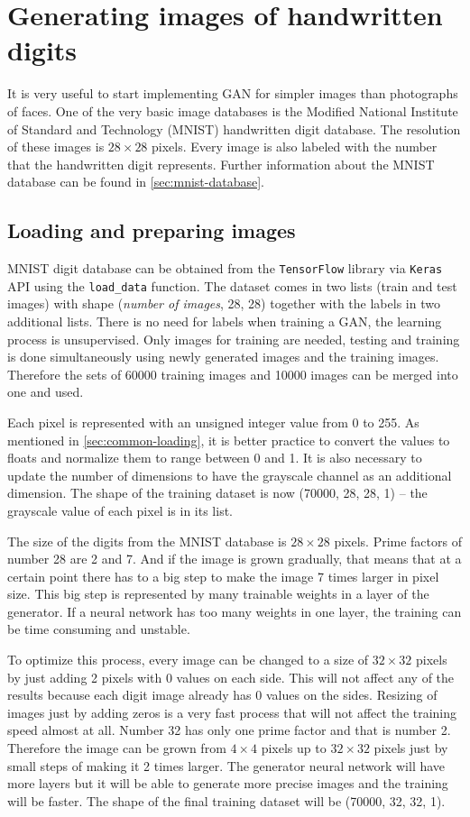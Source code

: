 \section{\label{sec:mnist-gan}Generating images of handwritten digits}
It is very useful to start implementing GAN for simpler images than photographs of faces. One of the very basic image databases is the Modified National Institute of Standard and Technology (MNIST) handwritten digit database. The resolution of these images is $28\times 28$ pixels. Every image is also labeled with the number that the handwritten digit represents. Further information about the MNIST database can be found in \autoref{sec:mnist-database}.

\subsection*{Loading and preparing images}
MNIST digit database can be obtained from the \texttt{TensorFlow} library via \texttt{Keras} API using the \texttt{load\_data} function. The dataset comes in two lists (train and test images) with shape (\textit{number of images}, 28, 28) together with the labels in two additional lists. There is no need for labels when training a GAN, the learning process is unsupervised. Only images for training are needed, testing and training is done simultaneously using newly generated images and the training images. Therefore the sets of 60000 training images and 10000 images can be merged into one and used.

Each pixel is represented with an unsigned integer value from 0 to 255. As mentioned in \autoref{sec:common-loading}, it is better practice to convert the values to floats and normalize them to range between 0 and 1. It is also necessary to update the number of dimensions to have the grayscale channel as an additional dimension. The shape of the training dataset is now (70000, 28, 28, 1) -- the grayscale value of each pixel is in its list.

The size of the digits from the MNIST database is $28\times 28$ pixels. Prime factors of number 28 are 2 and 7. And if the image is grown gradually, that means that at a certain point there has to a big step to make the image 7 times larger in pixel size. This big step is represented by many trainable weights in a layer of the generator. If a neural network has too many weights in one layer, the training can be time consuming and unstable.

To optimize this process, every image can be changed to a size of $32\times 32$ pixels by just adding 2 pixels with 0 values on each side. This will not affect any of the results because each digit image already has 0 values on the sides. Resizing of images just by adding zeros is a very fast process that will not affect the training speed almost at all. Number 32 has only one prime factor and that is number 2. Therefore the image can be grown from $4\times 4$ pixels up to $32\times 32$ pixels just by small steps of making it 2 times larger. The generator neural network will have more layers but it will be able to generate more precise images and the training will be faster. The shape of the final training dataset will be (70000, 32, 32, 1).

